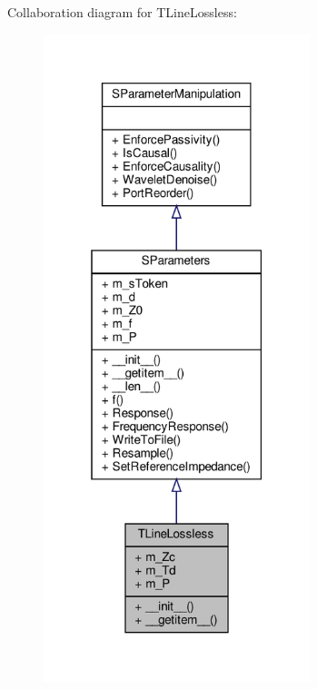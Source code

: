 Collaboration diagram for T\+Line\+Lossless\+:\nopagebreak
\begin{figure}[H]
\begin{center}
\leavevmode
\includegraphics[width=220pt]{classSignalIntegrity_1_1SParameters_1_1Devices_1_1TLineLossless_1_1TLineLossless__coll__graph}
\end{center}
\end{figure}
